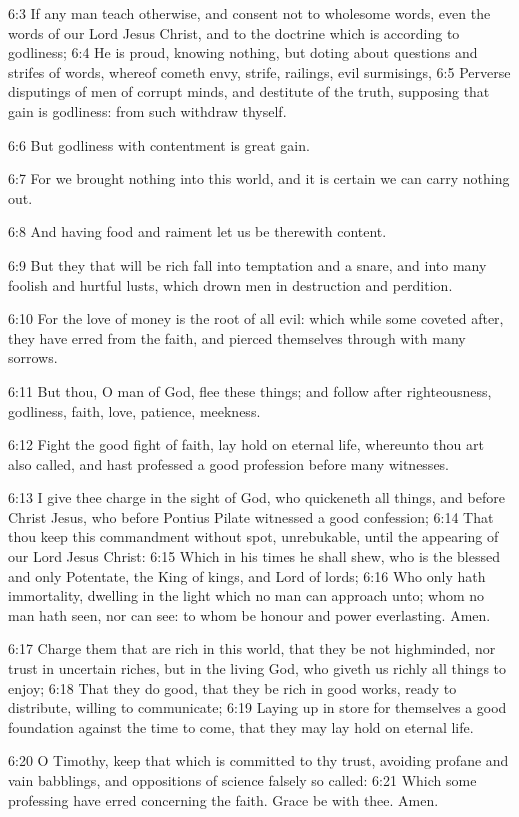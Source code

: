 6:3 If any man teach otherwise, and consent not to wholesome words, even the words of our Lord Jesus Christ, and to the doctrine which is according to godliness; 6:4 He is proud, knowing nothing, but doting about questions and strifes of words, whereof cometh envy, strife, railings, evil surmisings, 6:5 Perverse disputings of men of corrupt minds, and destitute of the truth, supposing that gain is godliness: from such withdraw thyself.

6:6 But godliness with contentment is great gain.

6:7 For we brought nothing into this world, and it is certain we can carry nothing out.

6:8 And having food and raiment let us be therewith content.

6:9 But they that will be rich fall into temptation and a snare, and into many foolish and hurtful lusts, which drown men in destruction and perdition.

6:10 For the love of money is the root of all evil: which while some coveted after, they have erred from the faith, and pierced themselves through with many sorrows.

6:11 But thou, O man of God, flee these things; and follow after righteousness, godliness, faith, love, patience, meekness.

6:12 Fight the good fight of faith, lay hold on eternal life, whereunto thou art also called, and hast professed a good profession before many witnesses.

6:13 I give thee charge in the sight of God, who quickeneth all things, and before Christ Jesus, who before Pontius Pilate witnessed a good confession; 6:14 That thou keep this commandment without spot, unrebukable, until the appearing of our Lord Jesus Christ: 6:15 Which in his times he shall shew, who is the blessed and only Potentate, the King of kings, and Lord of lords; 6:16 Who only hath immortality, dwelling in the light which no man can approach unto; whom no man hath seen, nor can see: to whom be honour and power everlasting. Amen.

6:17 Charge them that are rich in this world, that they be not highminded, nor trust in uncertain riches, but in the living God, who giveth us richly all things to enjoy; 6:18 That they do good, that they be rich in good works, ready to distribute, willing to communicate; 6:19 Laying up in store for themselves a good foundation against the time to come, that they may lay hold on eternal life.

6:20 O Timothy, keep that which is committed to thy trust, avoiding profane and vain babblings, and oppositions of science falsely so called: 6:21 Which some professing have erred concerning the faith.  Grace be with thee. Amen.

